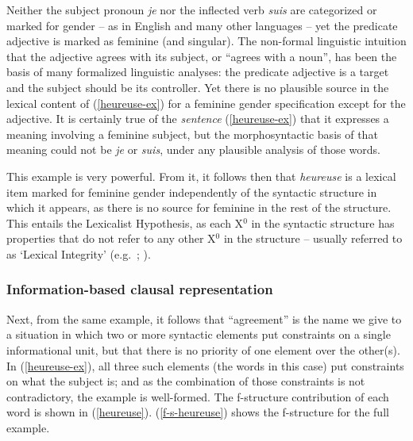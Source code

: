 \documentclass[output=paper,hidelinks]{langscibook}
\begin{document}
Neither the subject pronoun \textit{je} nor the inflected verb
\textit{suis} are categorized or marked for gender -- as in English and
many other languages -- yet the predicate adjective is marked as
feminine (and singular). The non-formal linguistic intuition that the
adjective agrees with its subject, or ``agrees with a noun'', has been
the basis of many formalized linguistic analyses: the predicate
adjective is a target and the subject should be its controller. Yet
there is no plausible source in the lexical content of
(\ref{heureuse-ex}) for a feminine gender specification except for the
adjective. It is certainly true of the \textit{sentence}
(\ref{heureuse-ex}) that it expresses a meaning involving a feminine
subject, but the morphosyntactic basis of that meaning could not be
\textit{je} or \textit{suis}, under any plausible analysis of those words.

This example is very powerful. From it, it follows then that
\textit{heureuse} is a lexical item marked for feminine gender
independently of the syntactic structure in which it appears, as there
is no source for feminine in the rest of the structure. This entails
the Lexicalist Hypothesis, as each X$^0$ in the syntactic
structure has properties that do not refer to any other X$^0$ in
the structure -- usually referred to as `Lexical Integrity'
(e.g.~\citealp[92]{bresnan2001lexical}; \citealp[92]{BresnanEtAl2016}).

\subsubsection{Information-based clausal representation}
\label{sec:minimalism:info-based}

Next, from the same example, it follows that ``agreement'' is the name
we give to a situation in which two or more syntactic elements put
constraints on a single informational unit, but that there is no
priority of one element over the other(s). In (\ref{heureuse-ex}), all
three such elements (the words in this case) put constraints on what
the subject is; and as the combination of those constraints is not
contradictory, the example is well-formed. The f-structure
contribution of each word is shown in
(\ref{heureuse}). (\ref{f-s-heureuse}) shows the f-structure for the
full example.
\end{document}
